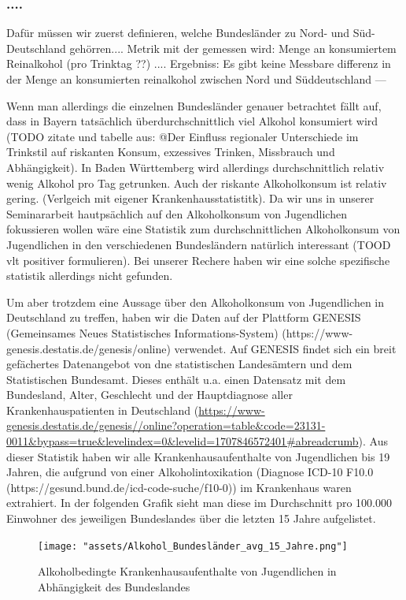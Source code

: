 \documentclass{article}
\begin{document}
\subsubsection {....}
Dafür müssen wir zuerst definieren, welche Bundesländer zu Nord- und Süd- Deutschland gehörren.... 
Metrik mit der gemessen wird: Menge an konsumiertem Reinalkohol (pro Trinktag ??)
....
Ergebniss: Es gibt keine Messbare differenz in der Menge an konsumierten reinalkohol zwischen Nord und Süddeutschland
---

Wenn man allerdings die einzelnen Bundesländer genauer betrachtet fällt auf, dass in Bayern tatsächlich überdurchschnittlich viel Alkohol konsumiert wird (TODO zitate und tabelle aus: @Der Einfluss regionaler Unterschiede im Trinkstil auf riskanten Konsum, exzessives Trinken, Missbrauch und Abhängigkeit). In Baden Württemberg wird allerdings durchschnittlich relativ wenig Alkohol pro Tag getrunken. Auch der riskante Alkoholkonsum ist relativ gering. (Verlgeich mit eigener Krankenhausstatistitk). Da wir uns in unserer Seminararbeit hautpsächlich auf den Alkoholkonsum von Jugendlichen fokussieren wollen wäre eine Statistik zum durchschnittlichen Alkoholkonsum von Jugendlichen in den verschiedenen Bundesländern natürlich interessant (TOOD vlt positiver formulieren). Bei unserer Rechere haben wir eine solche spezifische statistik allerdings nicht gefunden. 

Um aber trotzdem eine Aussage über den Alkoholkonsum von Jugendlichen in Deutschland zu treffen, haben wir die Daten auf der Plattform GENESIS (Gemeinsames Neues Statistisches Informations-System) (https://www-genesis.destatis.de/genesis/online) verwendet. Auf GENESIS findet sich ein breit  gefächertes Datenangebot von dne statistischen Landesämtern und dem Statistischen Bundesamt. Dieses enthält u.a. einen Datensatz mit dem Bundesland, Alter, Geschlecht und der Hauptdiagnose aller Krankenhauspatienten in Deutschland (\url{https://www-genesis.destatis.de/genesis//online?operation=table&code=23131-0011&bypass=true&levelindex=0&levelid=1707846572401#abreadcrumb}). Aus dieser Statistik haben wir alle Krankenhausaufenthalte von Jugendlichen bis 19 Jahren, die aufgrund von einer Alkoholintoxikation (Diagnose ICD-10 F10.0 (https://gesund.bund.de/icd-code-suche/f10-0)) im Krankenhaus waren extrahiert. In der folgenden Grafik sieht man diese im Durchschnitt pro 100.000 Einwohner des jeweiligen Bundeslandes über die letzten 15 Jahre aufgelistet.

\begin{figure}[h]
    \centering
    \texttt{[image: "assets/Alkohol\_Bundesländer\_avg\_15\_Jahre.png"]}
    \caption{Alkoholbedingte Krankenhausaufenthalte von Jugendlichen in Abhängigkeit des Bundeslandes}
    \label{fig}
\end{figure}
\end{document}
